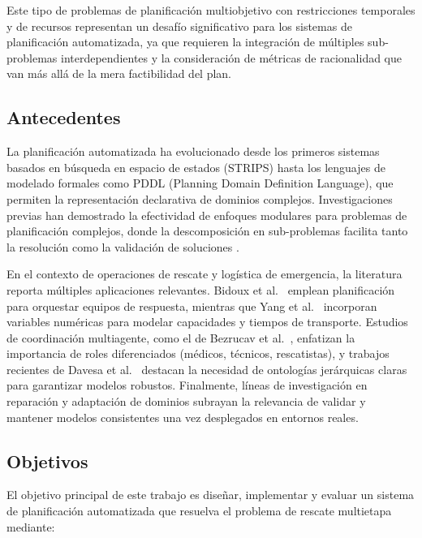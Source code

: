 \documentclass[conference]{IEEEtran}
\begin{document}
    Este tipo de problemas de planificación multiobjetivo con restricciones temporales y de recursos representan un desafío significativo para los sistemas de planificación automatizada, ya que requieren la integración de múltiples sub-problemas interdependientes y la consideración de métricas de racionalidad que van más allá de la mera factibilidad del plan.

    \subsection{Antecedentes}

    La planificación automatizada ha evolucionado desde los primeros sistemas basados en búsqueda en espacio de estados (STRIPS) hasta los lenguajes de modelado formales como PDDL (Planning Domain Definition Language), que permiten la representación declarativa de dominios complejos. Investigaciones previas han demostrado la efectividad de enfoques modulares para problemas de planificación complejos, donde la descomposición en sub-problemas facilita tanto la resolución como la validación de soluciones \cite{haslum2019}.

    En el contexto de operaciones de rescate y logística de emergencia, la literatura reporta múltiples aplicaciones relevantes. Bidoux et al.\ \cite{bidoux2017} emplean planificación para orquestar equipos de respuesta, mientras que Yang et al.\ \cite{yang2022} incorporan variables numéricas para modelar capacidades y tiempos de transporte. Estudios de coordinación multiagente, como el de Bezrucav et al.\ \cite{bezrucav2022}, enfatizan la importancia de roles diferenciados (médicos, técnicos, rescatistas), y trabajos recientes de Davesa et al.\ \cite{davesa2024} destacan la necesidad de ontologías jerárquicas claras para garantizar modelos robustos. Finalmente, líneas de investigación en reparación y adaptación de dominios \cite{bercher2025,heuss2024} subrayan la relevancia de validar y mantener modelos consistentes una vez desplegados en entornos reales.

    \subsection{Objetivos}

    El objetivo principal de este trabajo es diseñar, implementar y evaluar un sistema de planificación automatizada que resuelva el problema de rescate multietapa mediante:
\end{document}
